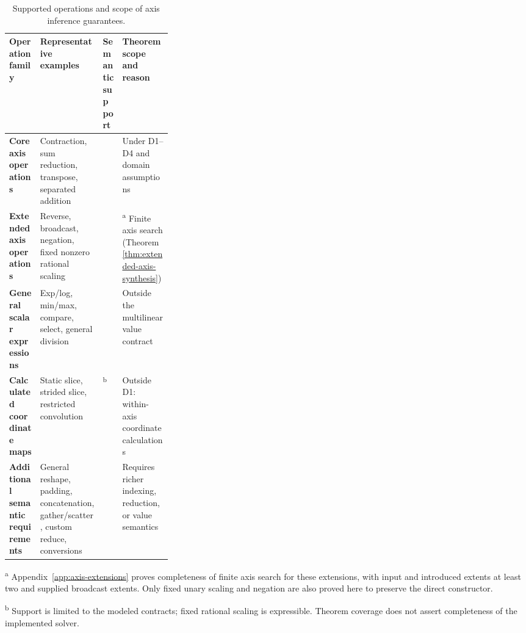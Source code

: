 \begin{table}[!htbp]
\caption{Supported operations and scope of axis inference guarantees.}
\label{tab:semantic-coverage}
\centering
\small
\setlength{\tabcolsep}{4pt}
\renewcommand{\arraystretch}{1}
\begin{tabularx}{\linewidth}{@{}>{\raggedright\arraybackslash}p{0.19\linewidth}Y>{\centering\arraybackslash}p{0.12\linewidth}Y@{}}\toprule
Operation family & Representative examples & Semantic support & Theorem scope and reason\\[2pt]\midrule
\textbf{Core axis operations}
& Contraction, sum reduction, transpose, separated addition
& \textcolor{green!45!black}{}
& \textcolor{green!45!black}{} Under D1--D4 and domain assumptions\\
\addlinespace
\textbf{Extended axis operations}
& Reverse, broadcast, negation, fixed nonzero rational scaling
& \textcolor{green!45!black}{}
& \textcolor{green!45!black}{}\textsuperscript{a} Finite axis search
(Theorem~\ref{thm:extended-axis-synthesis})\\
\addlinespace
\textbf{General scalar expressions}
& Exp/log, min/max, compare, select, general division
& \textcolor{green!45!black}{}
& \textcolor{red!75!black}{} Outside the multilinear value contract\\
\addlinespace
\textbf{Calculated coordinate maps}
& Static slice, strided slice, restricted convolution
& \textcolor{green!45!black}{}\textsuperscript{b}
& \textcolor{red!75!black}{} Outside D1: within-axis coordinate calculations\\
\addlinespace
\textbf{Additional semantic requirements}
& General reshape, padding, concatenation, gather/scatter, custom reduce, conversions
& \textcolor{red!75!black}{}
& \textcolor{red!75!black}{} Requires richer indexing, reduction, or value semantics\\\bottomrule
\end{tabularx}
\par\smallskip
\begin{minipage}{\linewidth}
\footnotesize
\textsuperscript{a} Appendix~\ref{app:axis-extensions} proves completeness
of finite axis search for these extensions, with input and introduced
extents at least two and supplied broadcast extents. Only fixed unary
scaling and negation are also proved here to preserve the direct constructor.
\par\smallskip
\textsuperscript{b} Support is limited to the modeled contracts; fixed
rational scaling is expressible. Theorem coverage does not assert
completeness of the implemented solver.
\end{minipage}
\end{table}

